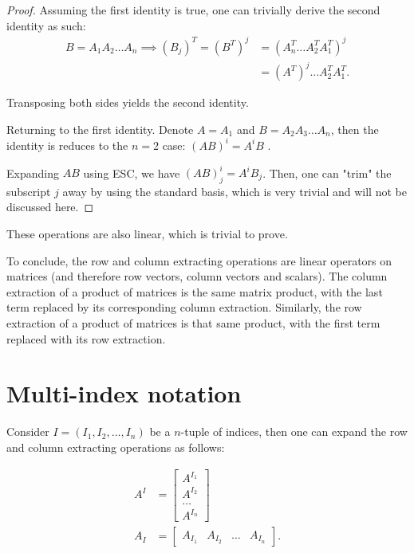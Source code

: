 \begin{proof}
  Assuming the first identity is true, one can trivially derive the second
  identity as such:
  \begin{align*}
    B = A_{1}A_{2}\ldots A_{n} \implies (B_{j})^{T} = (B^{T})^{j} &=
    (A_{n}^{T}\ldots A_{2}^{T}A_{1}^{T})^{j} \\
                                                                  &=
                                                                  (A^{T})^{j}\ldots
A_{2}^{T}A_{1}^{T}
  .\end{align*}

  Transposing both sides yields the second identity.

  Returning to the first identity. Denote \( A = A_{1} \) and \( B = A_{2}A_{3}
  \ldots A_{n} \),
  then the identity is reduces to the \( n = 2 \) case: \( (AB)^{i} = A^{i}B \)
  .

  Expanding \( AB \) using ESC, we have \( (AB)^{i}_{j} = A^{i}B_{j} \). Then,
  one can "trim" the subscript \( j \) away by using the standard basis, which
  is very trivial and will not be discussed here.
\end{proof}

These operations are also linear, which is trivial to prove.

To conclude, the row and column extracting operations are linear operators on
matrices (and therefore row vectors, column vectors and scalars). The
column extraction of a product of matrices is the same matrix product, with the
last term replaced by its corresponding column extraction. Similarly, the row
extraction of a product of matrices is that same product, with the first term
replaced with its row extraction.


\section{Multi-index notation} %
\label{sec:Multi-index notation}

Consider \( I = (I_{1}, I_{2}, \ldots , I_{n}) \) be a \( n \)-tuple of
indices, then one can expand the row and column extracting operations as
follows:

\begin{align*}
  A^{I} &= \begin{bmatrix} A^{I_{1}} \\ A^{I_{2}} \\ \ldots \\ A^{I_{n}}
  \end{bmatrix} \\
  A_{I} &= \begin{bmatrix} A_{I_{1}} & A_{I_{2}} & \ldots & A_{I_{n}} \end{bmatrix} 
.\end{align*}

